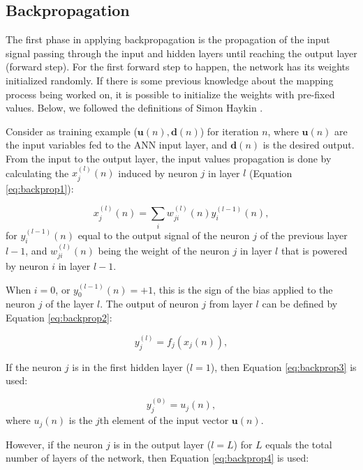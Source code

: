 \subsection{Backpropagation}
\label{ssec:Pseudocodigo}

The first phase in applying backpropagation is the propagation of the input signal passing through the input and hidden layers until reaching the output layer (forward step). For the first forward step to happen, the network has its weights initialized randomly. If there is some previous knowledge about the mapping process being worked on, it is possible to initialize the weights with pre-fixed values. Below, we followed the definitions of Simon Haykin \cite{haykin}.

Consider as training example ($\mathbf{u}(n), \mathbf{d}(n)$) for iteration $n$, where $\mathbf{u}(n)$ are the input variables fed to the ANN input layer, and $\mathbf{d} (n)$ is the desired output. From the input to the output layer, the input values propagation is done by calculating the $x_j^{(l)}(n)$ induced by neuron $j$ in layer $l$ (Equation \ref{eq:backprop1}):

\begin{equation}
\label{eq:backprop1}
    x_j^{(l)}(n) = \sum_i w_{ji}^{(l)}(n) y_i^{(l-1)}(n),
\end{equation}
for $y_i^{(l-1)}(n)$ equal to the output signal of the neuron $j$ of the previous layer $l-1$, and $w_{ji}^{(l)}(n)$ being the weight of the neuron $j$ in layer $l$ that is powered by neuron $i$ in layer $l-1$.

When $i=0$, or $y_0^{(l-1)}(n) = +1$, this is the sign of the bias applied to the neuron $j$ of the layer $l$. The output of neuron $j$ from layer $l$ can be defined by Equation \ref{eq:backprop2}:

\begin{equation}
\label{eq:backprop2}
    y_j^{(l)} = f_j (x_j (n) ),
\end{equation}

If the neuron $j$ is in the first hidden layer ($l = 1$), then Equation \ref{eq:backprop3} is used:

\begin{equation}
    \label{eq:backprop3}
    y_j^{(0)} = u_j (n),
\end{equation}
where $u_j(n)$ is the $j$th element of the input vector $\mathbf{u}(n)$. 

However, if the neuron $j$ is in the output layer ($l = L$) for $L$ equals the total number of layers of the network, then Equation \ref{eq:backprop4} is used:

